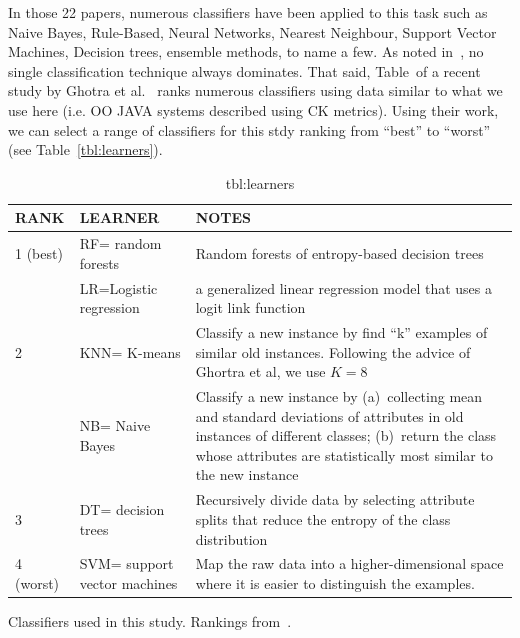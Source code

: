 \documentclass[10pt,conference]{IEEEtran}
\theoremstyle{break}
\theoremstyle{break}
\begin{document}
In those 22 papers,
numerous classifiers have been applied to this task such as
Naive Bayes, Rule-Based, Neural Networks, Nearest Neighbour, Support Vector Machines, Decision trees, ensemble methods, to name a few.
As
 noted in~\cite{lessmann2008benchmarking, ghotra2015revisiting},  no single classification technique always dominates.  
 That said, Table~\IX of a recent study by Ghotra et al.~\cite{ghotra2015revisiting}
 ranks numerous classifiers  using data similar
 to what we use here (i.e. OO JAVA systems described using CK metrics).
 Using their work, we can select
 a range of classifiers  for this stdy
 ranking from ``best''
 to ``worst'' (see Table~\ref{tbl:learners}).
 
 \begin{table}
 \begin{tabular}{l|l|p{5in}}
{\bf RANK} & {\bf LEARNER} & {\bf NOTES}\\\hline
 1 (best) & RF= random forests & 
 Random forests of entropy-based decision trees\\\cline{2-3}
 &  LR=Logistic regression &
 a generalized linear regression
model that uses a logit link function\\\hline
 2 & KNN= K-means &  Classify a new instance by find ``k'' examples of similar old instances.
 Following the advice of Ghortra et al, we use
 $K=8$\\\cline{2-3}
 \item
 & NB= Naive Bayes &  Classify a new instance by (a)~collecting mean and standard deviations of attributes in old instances of  different classes; (b)~return the class whose attributes are statistically most similar to the new instance\\\hline
 3 & DT= decision trees & Recursively
 divide data by selecting attribute splits
 that reduce the entropy of the class distribution\\\hline

 4 (worst) & SVM= support vector machines &
 Map the raw data into a higher-dimensional space where it is easier to distinguish the examples.
 \\\hline
 \end{tabular}
 \caption{Classifiers used in this study.
 Rankings
 from~\cite{ghotra2015revisiting}.}\caption{tbl:learners}
 \end{table}
 
   
 
\end{document}
